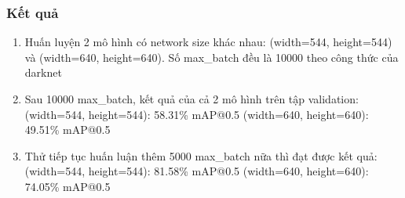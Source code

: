 \documentclass[20pt, a4paper]{article}
\begin{document}
\subsubsection{Kết quả}
\begin{enumerate}
	\item Huấn luyện 2 mô hình có network size khác nhau: (width=544, height=544) và (width=640, height=640). Số max\_batch đều là 10000 theo công thức của darknet
	\item Sau 10000 max\_batch, kết quả của cả 2 mô hình trên tập validation: 
		\subitem (width=544, height=544): 58.31\% mAP@0.5
		\subitem (width=640, height=640): 49.51\% mAP@0.5
	\item Thử tiếp tục huấn luận thêm 5000 max\_batch nữa thì đạt được kết quả: 
		\subitem (width=544, height=544): 81.58\% mAP@0.5
		\subitem (width=640, height=640): 74.05\% mAP@0.5


\end{enumerate}
\end{document}
